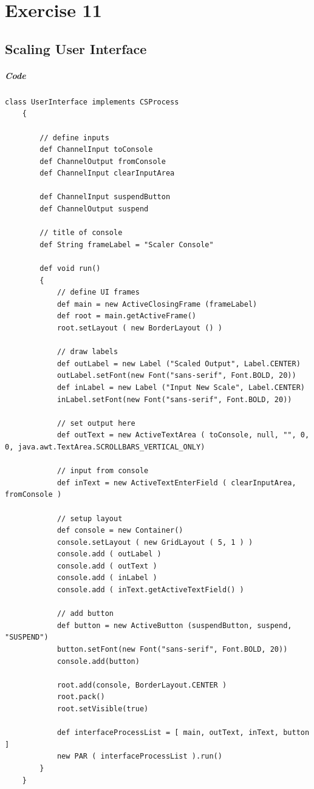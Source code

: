 \documentclass[10pt, a4paper]{article}
\begin{document}
   \setcounter{section}{11}
   \section*{Exercise 11}
   
   \setcounter{subsection}{0}

   \subsection{Scaling User Interface}
   
   \subparagraph{Code} \hfill
   \begin{lstlisting}[caption = "UserInterface.groovy"]
   	class UserInterface implements CSProcess
   	{
   	
   		// define inputs
   		def ChannelInput toConsole
   		def ChannelOutput fromConsole
   		def ChannelInput clearInputArea
   	
   		def ChannelInput suspendButton
   		def ChannelOutput suspend
   	
   		// title of console
   		def String frameLabel = "Scaler Console"
   	
   		def void run()
   		{
   			// define UI frames		
   			def main = new ActiveClosingFrame (frameLabel)
   			def root = main.getActiveFrame()
   			root.setLayout ( new BorderLayout () )
   	
   			// draw labels
   			def outLabel = new Label ("Scaled Output", Label.CENTER)
   			outLabel.setFont(new Font("sans-serif", Font.BOLD, 20))
   			def inLabel = new Label ("Input New Scale", Label.CENTER)
   			inLabel.setFont(new Font("sans-serif", Font.BOLD, 20))
   	
   			// set output here
   			def outText = new ActiveTextArea ( toConsole, null, "", 0, 0, java.awt.TextArea.SCROLLBARS_VERTICAL_ONLY)
   	
   			// input from console
   			def inText = new ActiveTextEnterField ( clearInputArea, fromConsole )
   			
   			// setup layout
   			def console = new Container()
   			console.setLayout ( new GridLayout ( 5, 1 ) )
   			console.add ( outLabel )
   			console.add ( outText )
   			console.add ( inLabel )
   			console.add ( inText.getActiveTextField() )
   	
   			// add button
   			def button = new ActiveButton (suspendButton, suspend, "SUSPEND")
   			button.setFont(new Font("sans-serif", Font.BOLD, 20))
   			console.add(button)
   	
   			root.add(console, BorderLayout.CENTER )
   			root.pack()
   			root.setVisible(true)
   			
   			def interfaceProcessList = [ main, outText, inText, button ]
   			new PAR ( interfaceProcessList ).run()
   		}
   	}   \end{lstlisting}
   
\end{document}
